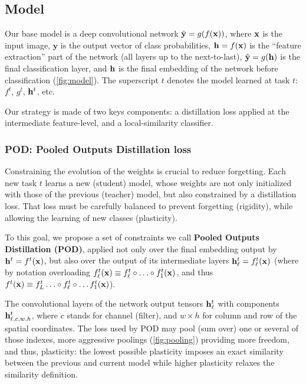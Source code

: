 \subsection{Model}
\label{sec:podnet_model}

Our base model is a deep convolutional network $\hat{\mathbf{y}} = g(f(\mathbf{x}))$, where $\mathbf{x}$ is the input image,
$\mathbf{y}$ is the output vector of class probabilities, $\mathbf{h} = f(\mathbf{x})$ is the ``feature
extraction'' part of the network (all layers up to the next-to-last), $\hat{\mathbf{y}} = g(\mathbf{h})$ is the final
classification layer, and $\mathbf{h}$ is the final embedding of the network before classification
(\autoref{fig:model}). The superscript $t$ denotes the model learned at task $t$:$f^{t}$, $g^{t}$,
$\mathbf{h}^{t}$, etc.

Our strategy is made of two keys components: a distillation loss applied at the intermediate
feature-level, and a local-similarity classifier.

\subsubsection{POD: Pooled Outputs Distillation loss}
\label{sec:pod}

Constraining the evolution of the weights is crucial to reduce forgetting. Each new task $t$ learns
a new (student) model, whose weights are not only initialized with those of the previous (teacher)
model, but also constrained by a distillation loss. That loss must be carefully balanced to prevent
forgetting (rigidity), while allowing the learning of new classes (plasticity).

To this goal, we propose a set of constraints we call \textbf{Pooled Outputs Distillation (POD)},
applied not only over the final embedding output by $\mathbf{h}^{t}=f^{t}(\mathbf{x})$, but also over the output
of its intermediate layers $\mathbf{h}^{t}_\ell=f^{t}_\ell(\mathbf{x})$ (where by notation overloading
$f^{t}_\ell(\mathbf{x})\equiv f^{t}_\ell\circ\ldots\circ f^{t}_1(\mathbf{x})$, and thus $f^{t}(\mathbf{x})\equiv
    f^{t}_L\ldots\circ f^{t}_\ell\circ\ldots f^{t}_1(\mathbf{x})$).

The convolutional layers of the network output tensors $\mathbf{h}^{t}_{\ell}$ with components
$\mathbf{h}^{t}_{\ell,c,w,h}$, where $c$ stands for channel (filter), and $w\times h$ for column and row of
the spatial coordinates. The loss used by POD may pool (sum over) one or several of those indexes,
more aggressive poolings (\autoref{fig:pooling}) providing more freedom, and thus, plasticity: the
lowest possible plasticity imposes an exact similarity between the previous and current model while
higher plasticity relaxes the similarity definition.

